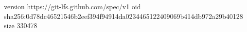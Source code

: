 version https://git-lfs.github.com/spec/v1
oid sha256:0d78dc46521546b2eef394f94914da0234465122409069b414db972a29b40128
size 330478
